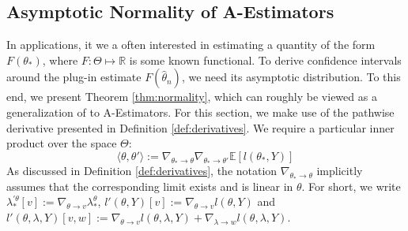 \documentclass[12pt]{article}
\theoremstyle{myplain}
\theoremstyle{definition}
\theoremstyle{definition}
\theoremstyle{remark}
\numberwithin{equation}{section}
\begin{document}
\subsection{Asymptotic Normality of A-Estimators}
\label{subsec:normality}
In applications, it we a often interested in estimating a quantity of the form $F(\theta_*)$, where $F:\Theta\mapsto\mathbb{R}$ is some known functional. To derive confidence intervals around the plug-in estimate $F(\widehat\theta_n)$, we need its asymptotic distribution. To this end, we present Theorem \ref{thm:normality}, which can roughly be viewed as a generalization of \cite{shen1997onmethods} to A-Estimators. For this section, we make use of the pathwise derivative presented in Definition \ref{def:derivatives}. We require a particular inner product over the space $\Theta$:
\[\langle \theta, \theta' \rangle := \nabla_{\theta_*\to\theta} \nabla_{\theta_*\to\theta'} \mathbb{E}[l(\theta_*, Y)]\]
As discussed in Definition \ref{def:derivatives}, the notation $\nabla_{\theta_*\to\theta}$ implicitly assumes that the corresponding limit exists and is linear in $\theta$. For short, we write $\lambda_*^{\prime\theta}[v]:=\nabla_{\theta\to v}\lambda_*^\theta$, $l'(\theta, Y)[v]:=\nabla_{\theta\to v}l(\theta, Y)$ and $l'(\theta,\lambda, Y)[v, w]:=\nabla_{\theta\to v} l(\theta,\lambda, Y) + \nabla_{\lambda\to w} l(\theta, \lambda, Y)$.
\end{document}
